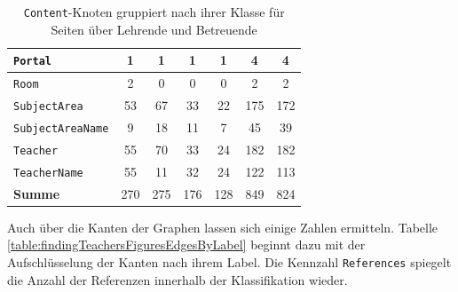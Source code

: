 \begin{table}[htb]
\begin{tabular}{|l|c|c|c|c|c|c|}
            \texttt{Portal}             & 1                                  & 1                                   & 1                                    & 1                                  & 4                                   & 4                                  \\ \hline
            \texttt{Room}               & 2                                  & 0                                   & 0                                    & 0                                  & 2                                   & 2                                  \\ \hline
            \texttt{SubjectArea}        & 53                                 & 67                                  & 33                                   & 22                                 & 175                                 & 172                                \\ \hline
            \texttt{SubjectAreaName}    & 9                                  & 18                                  & 11                                   & 7                                  & 45                                  & 39                                 \\ \hline
            \texttt{Teacher}            & 55                                 & 70                                  & 33                                   & 24                                 & 182                                 & 182                                \\ \hline
            \texttt{TeacherName}        & 55                                 & 11                                  & 32                                   & 24                                 & 122                                 & 113                                \\ \hline
            \hline
            \textbf{Summe}     & 270                                & 275                                 & 176                                  & 128                                & 849                                 & 824                                \\ \hline
        \end{tabular}
        \caption{\texttt{Content}-Knoten gruppiert nach ihrer Klasse für Seiten über Lehrende und Betreuende}
        \label{table:findingsTeachersFiguresContentNodesByClass}
    \end{table}

    Auch über die Kanten der Graphen lassen sich einige Zahlen ermitteln.
    Tabelle \ref{table:findingTeachersFiguresEdgesByLabel} beginnt dazu
    mit der Aufschlüsselung der Kanten nach ihrem Label.
    Die Kennzahl \texttt{References} spiegelt die Anzahl der Referenzen innerhalb der Klassifikation wieder.

